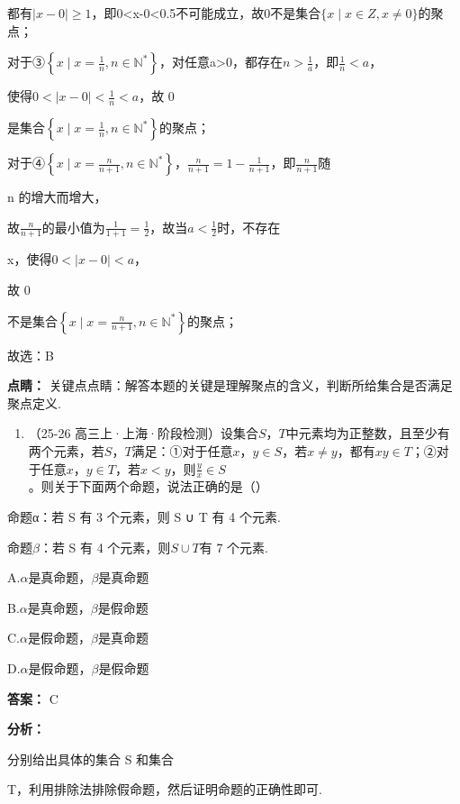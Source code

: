 \documentclass[11pt,a4paper]{ctexart}
\begin{document}
都有\(|x-0|\geq1\)，即0\textless\textbar x-0\textbar\textless0.5不可能成立，故0不是集合\(\{x\mid x\in Z,x\neq0\}\)的聚点；

对于③\(\left\{x\mid x=\frac{1}{n},n\in \mathbb{N}^{*}\right\}\)，对任意a\textgreater0，都存在\(n>\frac{1}{a}\)，即\(\frac{1}{n}<a\)，

使得\(0 < |x - 0| < \frac{1}{n} < a\)，故 0

是集合\(\left\{x \mid x = \frac{1}{n}, n \in \mathbb{N}^{*}\right\}\)的聚点；

对于④\(\left\{x\mid x=\frac{n}{n+1},n\in\mathbb{N}^*\right\}\)，\(\frac{n}{n+1}=1-\frac{1}{n+1}\)，即\(\frac{n}{n+1}\)随

n 的增大而增大，

故\(\frac{n}{n+1}\)的最小值为\(\frac{1}{1+1}=\frac{1}{2}\)，故当\(a<\frac{1}{2}\)时，不存在

x，使得\(0<|x-0|<a\)，

故 0

不是集合\(\left\{x\mid x=\frac{n}{n+1},n\in\mathbb{N}^*\right\}\)的聚点；

故选：B

\textbf{点睛：}
关键点点睛：解答本题的关键是理解聚点的含义，判断所给集合是否满足聚点定义.

\begin{enumerate}[label=\arabic*., leftmargin=*, start=22]
\item （25-26
  高三上·上海·阶段检测）设集合\(S\)，\(T\)中元素均为正整数，且至少有两个元素，若\(S\)，\(T\)满足：①对于任意\(x\)，\(y \in S\)，若\(x \neq y\)，都有\(xy \in T\)；②对于任意\(x\)，\(y \in T\)，若\(x < y\)，则\(\frac{y}{x} \in S\)。则关于下面两个命题，说法正确的是（）
\end{enumerate}

命题α：若 S 有 3 个元素，则 S ∪ T 有 4 个元素.

命题\(\beta\)：若 S 有 4 个元素，则\(S \cup T\)有 7 个元素.

A.\(\alpha\)是真命题，\(\beta\)是真命题

B.\(\alpha\)是真命题，\(\beta\)是假命题

C.\(\alpha\)是假命题，\(\beta\)是真命题

D.\(\alpha\)是假命题，\(\beta\)是假命题

\textbf{答案：}
C

\textbf{分析：}

分别给出具体的集合 S 和集合

T，利用排除法排除假命题，然后证明命题的正确性即可.
\end{document}
